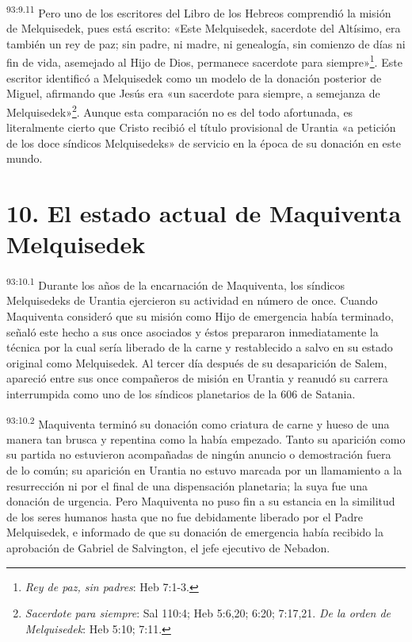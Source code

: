 \par
\textsuperscript{93:9.11} Pero uno de los escritores del Libro de los Hebreos comprendió la misión de Melquisedek, pues está escrito: «Este Melquisedek, sacerdote del Altísimo, era también un rey de paz; sin padre, ni madre, ni genealogía, sin comienzo de días ni fin de vida, asemejado al Hijo de Dios, permanece sacerdote para siempre»\footnote{\textit{Rey de paz, sin padres}: Heb 7:1-3.}. Este escritor identificó a Melquisedek como un modelo de la donación posterior de Miguel, afirmando que Jesús era «un sacerdote para siempre, a semejanza de Melquisedek»\footnote{\textit{Sacerdote para siempre}: Sal 110:4; Heb 5:6,20; 6:20; 7:17,21. \textit{De la orden de Melquisedek}: Heb 5:10; 7:11.}. Aunque esta comparación no es del todo afortunada, es literalmente cierto que Cristo recibió el título provisional de Urantia «a petición de los doce síndicos Melquisedeks» de servicio en la época de su donación en este mundo.

\section*{10. El estado actual de Maquiventa Melquisedek}
\par
\textsuperscript{93:10.1} Durante los años de la encarnación de Maquiventa, los síndicos Melquisedeks de Urantia ejercieron su actividad en número de once. Cuando Maquiventa consideró que su misión como Hijo de emergencia había terminado, señaló este hecho a sus once asociados y éstos prepararon inmediatamente la técnica por la cual sería liberado de la carne y restablecido a salvo en su estado original como Melquisedek. Al tercer día después de su desaparición de Salem, apareció entre sus once compañeros de misión en Urantia y reanudó su carrera interrumpida como uno de los síndicos planetarios de la 606 de Satania.

\par
\textsuperscript{93:10.2} Maquiventa terminó su donación como criatura de carne y hueso de una manera tan brusca y repentina como la había empezado. Tanto su aparición como su partida no estuvieron acompañadas de ningún anuncio o demostración fuera de lo común; su aparición en Urantia no estuvo marcada por un llamamiento a la resurrección ni por el final de una dispensación planetaria; la suya fue una donación de urgencia. Pero Maquiventa no puso fin a su estancia en la similitud de los seres humanos hasta que no fue debidamente liberado por el Padre Melquisedek, e informado de que su donación de emergencia había recibido la aprobación de Gabriel de Salvington, el jefe ejecutivo de Nebadon.

